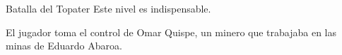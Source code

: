 \begin{subsubsection}{Batalla del Topater}
  \indispensable Este nivel es indispensable.

  El jugador toma el control de Omar Quispe, un minero que trabajaba en las minas de Eduardo Abaroa.

  
  
  
  
  

\end{subsubsection}
